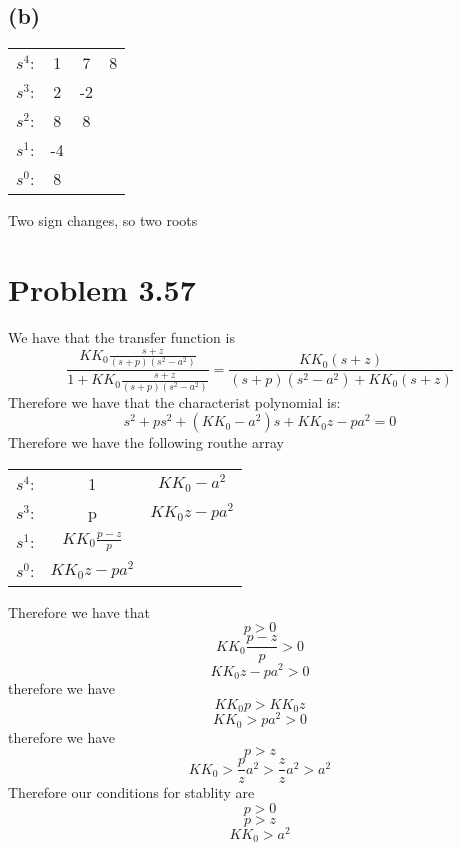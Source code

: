 \documentclass[12pt]{article}
\begin{document}
\subsection*{(b)}
\begin{center}
    \begin{tabular}{ c c c c} 
     $s^4$: & 1 & 7 & 8\\ 
     $s^3$: & 2 & -2&  \\ 
     $s^2$: & 8 & 8&\\
     $s^1$:  & -4 & &\\
     $s^0$: & 8 & &
\end{tabular} 
\end{center}
Two sign changes, so two roots
\section*{Problem 3.57}
We have that the transfer function is 
$$\frac{KK_0\frac{s+z}{(s+p)(s^2-a^2)}}{1+KK_0\frac{s+z}{(s+p)(s^2-a^2)}}=
\frac{KK_0(s+z)}{(s+p)(s^2-a^2)+KK_0(s+z)}$$
Therefore we have that the characterist polynomial is:
 $$s^2+ps^2+(KK_0-a^2)s+KK_0z-pa^2=0$$
Therefore we have the following routhe array
\begin{center}
    \begin{tabular}{ c c c} 
     $s^4$: & 1 & $KK_0-a^2$\\ 
     $s^3$: & p & $KK_0z-pa^2$ \\
     $s^1$: & $KK_0\frac{p-z}{p}$&\\
     $s^0$: & $KK_0z-pa^2$
    \end{tabular}
    \end{center}
Therefore we have that 
$$p>0$$
$$KK_0\frac{p-z}{p}>0$$
$$KK_0z-pa^2>0$$
therefore we have
$$KK_0p>KK_0z$$
$$KK_0>pa^2>0$$
therefore we have
$$p>z$$
$$KK_0>\frac{p}{z}a^2>\frac{z}{z}a^2>a^2$$
Therefore our conditions for stablity are 
$$p>0$$
$$p>z$$
$$KK_0>a^2$$


    
\end{document}
